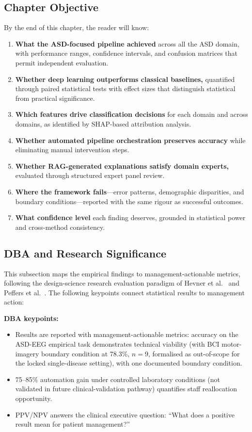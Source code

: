 \subsection{Chapter Objective}

By the end of this chapter, the reader will know:

\begin{enumerate}[label=(\alph*)]
    \item \textbf{What the ASD-focused pipeline achieved} across all the ASD domain, with performance ranges, confidence intervals, and confusion matrices that permit independent evaluation.
    \item \textbf{Whether deep learning outperforms classical baselines,} quantified through paired statistical tests with effect sizes that distinguish statistical from practical significance.
    \item \textbf{Which features drive classification decisions} for each domain and across domains, as identified by SHAP-based attribution analysis.
    \item \textbf{Whether automated pipeline orchestration preserves accuracy} while eliminating manual intervention steps.
    \item \textbf{Whether RAG-generated explanations satisfy domain experts,} evaluated through structured expert panel review.
    \item \textbf{Where the framework fails}---error patterns, demographic disparities, and boundary conditions---reported with the same rigour as successful outcomes.
    \item \textbf{What confidence level} each finding deserves, grounded in statistical power and cross-method consistency.
\end{enumerate}

\subsection{DBA and Research Significance}

This subsection maps the empirical findings to management-actionable metrics, following the design-science research evaluation paradigm of Hevner et al.~\cite{hevner2004design} and Peffers et al.~\cite{peffers2007dsr}. The following keypoints connect statistical results to management action:

\noindent\textbf{DBA keypoints:}
\begin{itemize}[leftmargin=*, itemsep=3pt]
    \item Results are reported with management-actionable metrics: \asdacc{} accuracy on the ASD-EEG empirical task demonstrates technical viability (with BCI motor-imagery boundary condition at 78.3\%, $n=9$, formalised as out-of-scope for the locked single-disease setting), with one documented boundary condition.
    \item 75--85\% automation gain under controlled laboratory conditions (not validated in future clinical-validation pathway) quantifies staff reallocation opportunity.
    \item PPV/NPV answers the clinical executive question: ``What does a positive result mean for patient management?''
\end{itemize}

